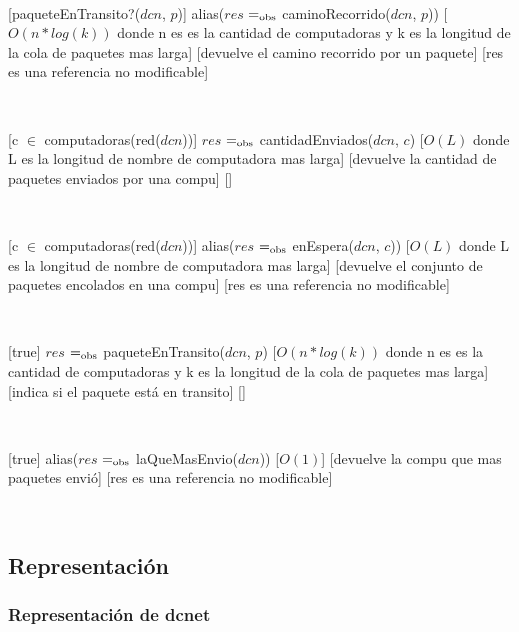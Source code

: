~

[paqueteEnTransito?($dcn$, $p$)]
{alias($res$ $=_{\mathrm{obs}}$ caminoRecorrido($dcn$, $p$))}
[$O(n * log(k))$ donde n es es la cantidad de computadoras y k es la longitud de la cola de paquetes mas larga]
[devuelve el camino recorrido por un paquete]
[res es una referencia no modificable]

~

[c $\in$ computadoras(red($dcn$))]
{$res$ $=_{\mathrm{obs}}$ cantidadEnviados($dcn$, $c$)}
[$O(L)$ donde L es la longitud de nombre de computadora mas larga]
[devuelve la cantidad de paquetes enviados por una compu]
[]

~

[c $\in$ computadoras(red($dcn$))]
{alias($res$ $=_{\mathrm{obs}}$ enEspera($dcn$, $c$))}
[$O(L)$ donde L es la longitud de nombre de computadora mas larga]
[devuelve el conjunto de paquetes encolados en una compu]
[res es una referencia no modificable]

~

[true]
{$res$ $=_{\mathrm{obs}}$ paqueteEnTransito($dcn$, $p$)}
[$O(n * log(k))$ donde n es es la cantidad de computadoras y k es la longitud de la cola de paquetes mas larga]
[indica si el paquete está en transito]
[]

~

[true]
{alias($res$ $=_{\mathrm{obs}}$ laQueMasEnvio($dcn$))}
[$O(1)$]
[devuelve la compu que mas paquetes envió]
[res es una referencia no modificable]

~

\subsection{Representación}

\subsubsection{Representación de dcnet}

